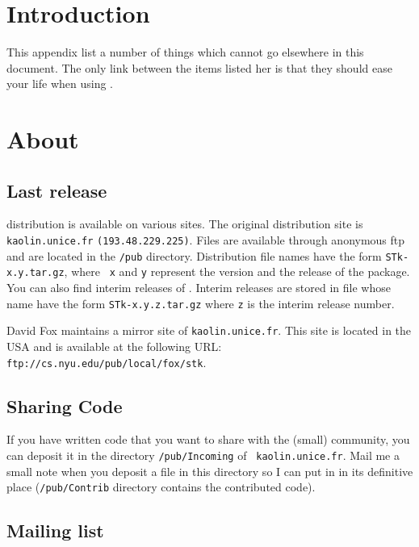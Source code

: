 %
%
%

\section{Introduction}
This appendix list a number of things which cannot go elsewhere in this
document. The only link between the items listed her is that they should
ease your life when using {\stk}. 

\section{About \stk}

\subsection{Last release}

{\stk} distribution is available on various sites. The original distribution
site is {\tt kaolin.unice.fr} {\tt (193.48.229.225)}. Files are available
through anonymous ftp and are located in the {\tt /pub}
directory. Distribution file names have the form {\tt STk-x.y.tar.gz}, where {\tt
x} and {\tt y} represent the version and the release of the package. You can
also find interim releases of {\stk}. Interim releases are stored in file
whose name have the form {\tt STk-x.y.z.tar.gz} where {\tt z} is the interim
release number.

David Fox maintains a mirror site of {\tt kaolin.unice.fr}. This site is
located in the USA and is available at the following URL: 
{\tt ftp://cs.nyu.edu/pub/local/fox/stk}.

\subsection{Sharing Code}

If you have written code that you want to share with the (small) {\stk}
community, you can deposit it in the directory {\tt /pub/Incoming} of {\tt
kaolin.unice.fr}. Mail me a small note when you deposit a file in this
directory so I can put in in its definitive place ({\tt /pub/Contrib} 
directory contains the contributed code).

\subsection{{\stk} Mailing list}

